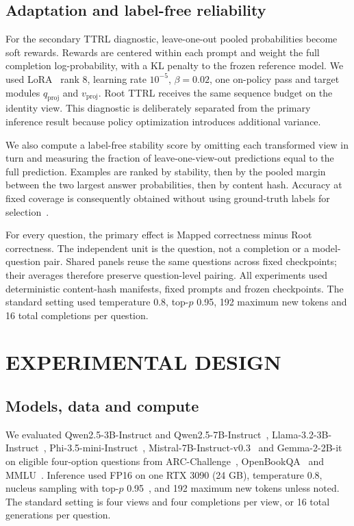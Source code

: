 \documentclass{article}
\begin{document}
\subsection{Adaptation and label-free reliability}
For the secondary TTRL diagnostic, leave-one-out pooled probabilities become soft rewards. Rewards are centered within each prompt and weight the full completion log-probability, with a KL penalty to the frozen reference model. We used LoRA~\cite{hu2022lora} rank 8, learning rate $10^{-5}$, $\beta=0.02$, one on-policy pass and target modules $q_{\mathrm{proj}}$ and $v_{\mathrm{proj}}$. Root TTRL receives the same sequence budget on the identity view. This diagnostic is deliberately separated from the primary inference result because policy optimization introduces additional variance.

We also compute a label-free stability score by omitting each transformed view in turn and measuring the fraction of leave-one-view-out predictions equal to the full prediction. Examples are ranked by stability, then by the pooled margin between the two largest answer probabilities, then by content hash. Accuracy at fixed coverage is consequently obtained without using ground-truth labels for selection~\cite{geifman2017selective}.

For every question, the primary effect is Mapped correctness minus Root correctness. The independent unit is the question, not a completion or a model-question pair. Shared panels reuse the same questions across fixed checkpoints; their averages therefore preserve question-level pairing. All experiments used deterministic content-hash manifests, fixed prompts and frozen checkpoints. The standard setting used temperature 0.8, top-$p$ 0.95, 192 maximum new tokens and 16 total completions per question.

\section{EXPERIMENTAL DESIGN}
\subsection{Models, data and compute}
We evaluated Qwen2.5-3B-Instruct and Qwen2.5-7B-Instruct~\cite{yang2024qwen25}, Llama-3.2-3B-Instruct~\cite{dubey2024llama}, Phi-3.5-mini-Instruct~\cite{abdin2024phi}, Mistral-7B-Instruct-v0.3~\cite{jiang2023mistral} and Gemma-2-2B-it~\cite{team2024gemma2} on eligible four-option questions from ARC-Challenge~\cite{clark2018arc}, OpenBookQA~\cite{mihaylov2018openbookqa} and MMLU~\cite{hendrycks2021mmlu}. Inference used FP16 on one RTX 3090 (24 GB), temperature 0.8, nucleus sampling with top-$p$ 0.95~\cite{holtzman2020curious}, and 192 maximum new tokens unless noted. The standard setting is four views and four completions per view, or 16 total generations per question.
\end{document}
